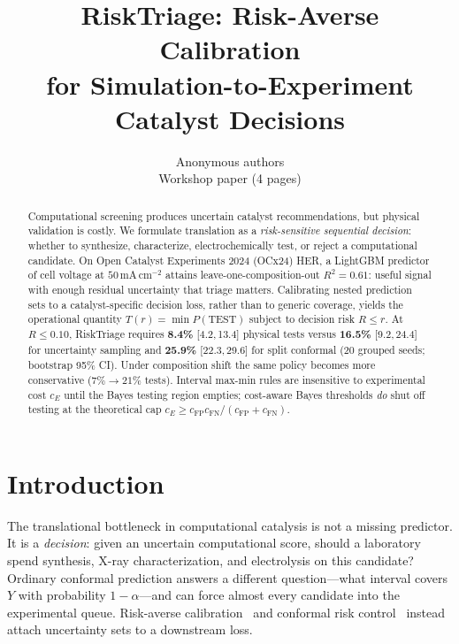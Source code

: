 \documentclass[10pt,twocolumn]{article}
\title{\vspace{-1.2em}\textbf{RiskTriage: Risk-Averse Calibration\\for Simulation-to-Experiment Catalyst Decisions}\vspace{-0.6em}}
\author{Anonymous authors\\Workshop paper (4 pages)}
\date{}
\newcommand{\cFP}{c_{\mathrm{FP}}}
\newcommand{\cFN}{c_{\mathrm{FN}}}
\begin{document}
\maketitle
\vspace{-1.2em}
\begin{abstract}
\vspace{-0.3em}
Computational screening produces uncertain catalyst recommendations, but physical validation is costly. We formulate translation as a \emph{risk-sensitive sequential decision}: whether to synthesize, characterize, electrochemically test, or reject a computational candidate. On Open Catalyst Experiments 2024 (OCx24) HER, a LightGBM predictor of cell voltage at \(50\,\mathrm{mA\,cm^{-2}}\) attains leave-one-composition-out \(R^2{=}0.61\): useful signal with enough residual uncertainty that triage matters. Calibrating nested prediction sets to a catalyst-specific decision loss, rather than to generic coverage, yields the operational quantity \(T(r)=\min P(\mathrm{TEST})\) subject to decision risk \(R\le r\). At \(R\le 0.10\), RiskTriage requires \textbf{8.4\%} {[4.2,\,13.4]} physical tests versus \textbf{16.5\%} {[9.2,\,24.4]} for uncertainty sampling and \textbf{25.9\%} {[22.3,\,29.6]} for split conformal (20 grouped seeds; bootstrap 95\% CI). Under composition shift the same policy becomes more conservative (\(7\%\to 21\%\) tests). Interval max-min rules are insensitive to experimental cost \(c_E\) until the Bayes testing region empties; cost-aware Bayes thresholds \emph{do} shut off testing at the theoretical cap \(c_E\ge \cFP\cFN/(\cFP+\cFN)\).
\vspace{-0.4em}
\end{abstract}

\vspace{-0.5em}
\section{Introduction}
\vspace{-0.3em}
The translational bottleneck in computational catalysis is not a missing predictor. It is a \emph{decision}: given an uncertain computational score, should a laboratory spend synthesis, X-ray characterization, and electrolysis on this candidate? Ordinary conformal prediction answers a different question---what interval covers \(Y\) with probability \(1-\alpha\)---and can force almost every candidate into the experimental queue. Risk-averse calibration~\citep{kiyani2025} and conformal risk control~\citep{angelopoulos2024crc} instead attach uncertainty sets to a downstream loss.
\end{document}
